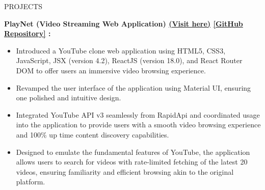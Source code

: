 \documentclass{resume} %
\begin{document}
\begin{rSection}{PROJECTS}
    \item \textbf{PlayNet (Video Streaming Web Application)
    {\href{https://play-net-eight.vercel.app/}{(Visit here)}}
    {\href{https://github.com/arkapg211002/PlayNet}{[GitHub Repository]}} :} 
    \vspace{-0.6em}
    \begin{itemize}
    \setlength\itemsep{-0.6em}
     \item Introduced  a  YouTube  clone  web  application  using  HTML5,  CSS3,  JavaScript,  JSX  (version  4.2),  ReactJS (version 18.0), and React Router DOM to offer users an immersive video browsing experience.
    \item Revamped the user interface of the application using Material UI, ensuring one polished and intuitive design.
    \item Integrated  YouTube  API  v3  seamlessly from RapidApi and coordinated usage into  the  application  to  provide  users  with  a  smooth  video  browsing experience and 100\% up time content discovery capabilities.
    \item Designed  to  emulate  the  fundamental  features  of  YouTube,  the  application  allows  users  to  search  for  videos with rate-limited fetching of the latest 20 videos, ensuring familiarity and efficient browsing akin to the original platform.
    \end{itemize}

\end{rSection}
\end{document}
